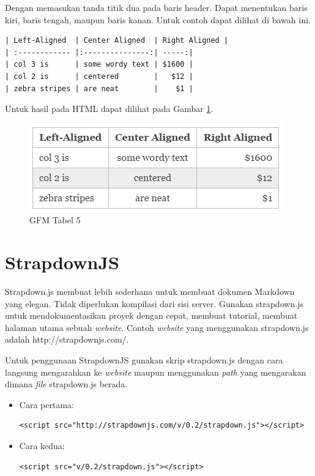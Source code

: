 \begin{itemize}
\begin{itemize}
\begin{itemize}
Dengan memasukan tanda titik dua pada baris header. Dapat menentukan baris kiri,
baris tengah, maupun baris kanan. Untuk contoh dapat dilihat di bawah ini.
\begin{lstlisting}[basicstyle=\footnotesize]
| Left-Aligned  | Center Aligned  | Right Aligned |
| :------------ |:---------------:| -----:|
| col 3 is      | some wordy text | $1600 |
| col 2 is      | centered        |   $12 |
| zebra stripes | are neat        |    $1 |
\end{lstlisting}
Untuk hasil pada HTML dapat dilihat pada Gambar \ref{fig:t5}.
\begin{figure}[H]
\centering
\includegraphics[scale=1]{Gambar/t5.png}
\caption[GFM Tabel 5]{GFM Tabel 5}
\label{fig:t5}
\end{figure}
\end{itemize}

\section{StrapdownJS \cite{Strapdownjs:2014}}
\label{sec:stapdownjs}

Strapdown.js membuat lebih sederhana untuk membuat dokumen Markdown yang elegan.
Tidak diperlukan kompilasi dari sisi server. Gunakan strapdown.js untuk
mendokumentasikan proyek dengan cepat, membuat tutorial, membuat halaman utama
sebuah {\it website}. Contoh {\it website} yang menggunakan strapdown.js adalah
http://strapdownjs.com/.

Untuk penggunaan StrapdownJS gunakan skrip strapdown.js dengan cara langsung
mengarahkan ke {\it website} maupun menggunakan {\it path} yang mengarakan
dimana {\it file} strapdown.js berada.
\begin{itemize}
\item Cara pertama:\\
\begin{lstlisting}[basicstyle=\footnotesize]
<script src="http://strapdownjs.com/v/0.2/strapdown.js"></script>
\end{lstlisting}
\item Cara kedua:\\
\begin{lstlisting}[basicstyle=\footnotesize]
<script src="v/0.2/strapdown.js"></script>
\end{lstlisting}
\end{itemize}


\end{itemize}
\end{itemize}
